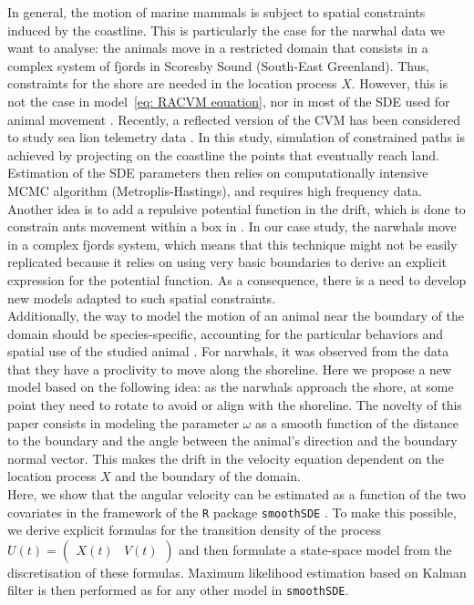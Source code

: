 \documentclass[11pt]{article}
\newcommand {\1}{\mathbb{1}}
\theoremstyle{definition}
\theoremstyle{remark}
\theoremstyle{remark}
\begin{document}
In general, the motion of marine mammals is subject to spatial constraints induced by the coastline. This is particularly the case for the narwhal data we want to analyse: the animals move in a restricted domain that consists in a complex system of fjords in Scoresby Sound (South-East Greenland). Thus, constraints for the shore are needed in the location process $X$. However, this is not the case in model~\ref{eq: RACVM equation}, nor in most of the SDE used for animal movement \cite{johnson_continuoustime_2008,michelot_varying-coefficient_2021,gurarie_correlated_2017}. 
Recently, a reflected version of the CVM has been considered to study sea lion telemetry data \cite{hanks_reflected_2017}.
In this study, simulation of constrained paths is achieved by projecting on the coastline the  points that eventually reach land. Estimation of the SDE parameters then relies on computationally intensive MCMC algorithm (Metroplis-Hastings), and requires high frequency data. Another idea is to add a repulsive potential function in the drift, which is done to constrain ants movement within a box in \cite{russell_spatially_2018}. In our case study, the narwhals move in a complex fjords system, which means that this technique might not be easily replicated because it relies on using very basic boundaries to derive an explicit expression for the potential function. As a consequence, there is a need to develop new models adapted to such spatial constraints.\\
Additionally, the way to model the motion of an animal near the boundary of the domain should be species-specific, accounting for the particular behaviors and spatial use of the studied animal \cite{brillinger_simulating_2003}. For narwhals, it was observed from the data that they have a proclivity to move along the shoreline. Here we propose a new model based on the following idea: as the narwhals approach the shore, at some point they need to rotate to avoid or align with the shoreline. The novelty of this paper consists in modeling the parameter $\omega$ as a smooth function of the distance to the boundary and the angle between the animal's direction and the boundary normal vector. This makes the drift in the velocity equation dependent on the location process $X$ and the boundary of the domain.  \\ %



Here, we show that the angular velocity  can be estimated as a function of the two covariates in the framework of the \texttt{R} package \texttt{smoothSDE} \cite{michelot_varying-coefficient_2021}. To make this possible, we derive explicit formulas for the transition density of the process $U(t)=\begin{pmatrix} X(t) & V(t) \end{pmatrix}$ and then formulate a state-space model from the discretisation of these formulas. Maximum likelihood estimation based on Kalman filter is then performed as for any other model in \texttt{smoothSDE}.\\
\end{document}
